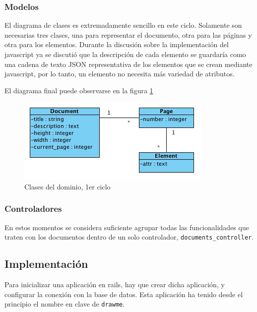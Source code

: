 \subsubsection{Modelos} %
\label{ssub:modelos}

El diagrama de clases es extremadamente sencillo en este ciclo. Solamente son necesarias tres clases, una para representar el documento, otra para las páginas y otra para los elementos. Durante la discusión sobre la implementación del javascript ya se discutió que la descripción de cada elemento se guardaría como una cadena de texto JSON representativa de los elementos que se crean mediante javascript, por lo tanto, un elemento no necesita más variedad de atributos.

El diagrama final puede observarse en la figura \ref{fig:uml1}

\begin{figure}[h!]
\centering
\includegraphics{uml1.png}
\caption{Clases del dominio, 1er ciclo}\label{fig:uml1}
\end{figure}



\subsubsection{Controladores} %
\label{ssub:controladores}

En estos momentos se considera suficiente agrupar todas las funcionalidades que traten con los documentos dentro de un solo controlador, \texttt{documents\_controller}. 



\subsection{Implementación} %
\label{sub:implementacion}

Para inicializar una aplicación en rails, hay que crear dicha aplicación, y configurar la conexión con la base de datos. Esta aplicación ha tenido desde el principio el nombre en clave de \texttt{drawme}. 

